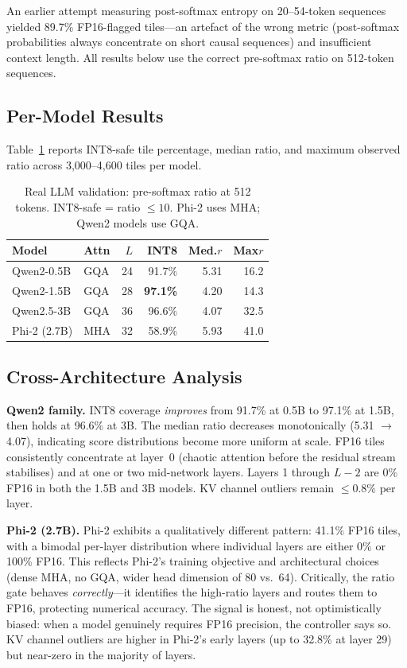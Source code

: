 \documentclass[10pt,twocolumn]{article}
\begin{document}
An earlier attempt measuring post-softmax entropy on 20--54-token
sequences yielded 89.7\% FP16-flagged tiles---an artefact of the wrong
metric (post-softmax probabilities always concentrate on short causal
sequences) and insufficient context length. All results below use the
correct pre-softmax ratio on 512-token sequences.

\subsection{Per-Model Results}

Table~\ref{tab:real_llm} reports INT8-safe tile percentage, median
ratio, and maximum observed ratio across 3{,}000--4{,}600 tiles per
model.

\begin{table}[tbp]
\centering
\caption{Real LLM validation: pre-softmax ratio at 512 tokens.
  INT8-safe = ratio $\leq 10$. Phi-2 uses MHA; Qwen2 models use GQA.}
\label{tab:real_llm}
\small
\setlength{\tabcolsep}{5pt}
\begin{tabular}{llrrrr}
\toprule
Model & Attn & $L$ & INT8 & Med.$r$ & Max$r$ \\
\midrule
Qwen2-0.5B  & GQA & 24 & 91.7\%          & 5.31 & 16.2 \\
Qwen2-1.5B  & GQA & 28 & \textbf{97.1\%} & 4.20 & 14.3 \\
Qwen2.5-3B  & GQA & 36 & 96.6\%          & 4.07 & 32.5 \\
Phi-2 (2.7B)& MHA & 32 & 58.9\%          & 5.93 & 41.0 \\
\bottomrule
\end{tabular}
\end{table}

\subsection{Cross-Architecture Analysis}

\textbf{Qwen2 family.}
INT8 coverage \emph{improves} from 91.7\% at 0.5B to 97.1\% at 1.5B,
then holds at 96.6\% at 3B. The median ratio decreases monotonically
(5.31 $\to$ 4.07), indicating score distributions become more uniform
at scale. FP16 tiles consistently concentrate at layer~0 (chaotic
attention before the residual stream stabilises) and at one or two
mid-network layers. Layers 1 through $L{-}2$ are 0\% FP16 in both the
1.5B and 3B models. KV channel outliers remain $\leq 0.8\%$ per layer.

\textbf{Phi-2 (2.7B).}
Phi-2 exhibits a qualitatively different pattern: 41.1\% FP16 tiles,
with a bimodal per-layer distribution where individual layers are
either 0\% or 100\% FP16. This reflects Phi-2's training objective
and architectural choices (dense MHA, no GQA, wider head dimension of
80 vs.\ 64). Critically, the ratio gate behaves \emph{correctly}---it
identifies the high-ratio layers and routes them to FP16, protecting
numerical accuracy. The signal is honest, not optimistically biased:
when a model genuinely requires FP16 precision, the controller says so.
KV channel outliers are higher in Phi-2's early layers (up to 32.8\%
at layer 29) but near-zero in the majority of layers.
\end{document}
